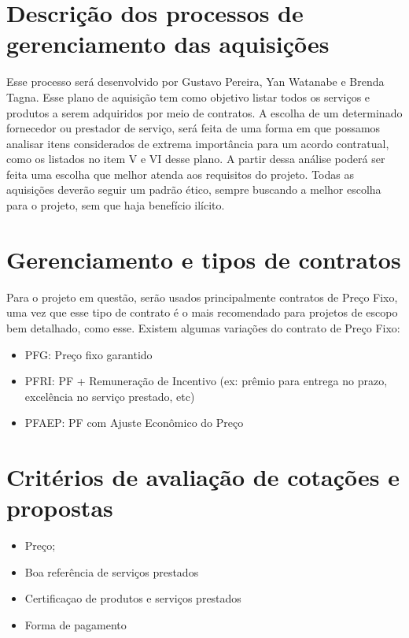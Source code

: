 \section*{Descrição dos processos de gerenciamento das aquisições}
  Esse processo será desenvolvido por Gustavo Pereira, Yan Watanabe e Brenda Tagna. Esse plano de aquisição tem como objetivo listar todos os serviços e produtos a serem adquiridos por meio de contratos. 
A escolha de um determinado fornecedor ou prestador de serviço, será feita de uma forma em que possamos analisar itens considerados de extrema importância para um acordo contratual, como os listados no item V e VI desse plano. A partir dessa análise poderá ser feita uma escolha que melhor atenda aos requisitos do projeto. 
Todas as aquisições deverão seguir um padrão ético, sempre buscando a melhor escolha para o projeto, sem que haja benefício ilícito. 

   
\section*{Gerenciamento e tipos de contratos}
Para o projeto em questão, serão usados principalmente contratos de Preço Fixo, uma vez que esse tipo de contrato é o mais recomendado para projetos de escopo bem detalhado, como esse. 
Existem algumas variações do contrato de Preço Fixo:
\begin{itemize}

\item PFG: Preço fixo garantido
\item PFRI: PF + Remuneração de Incentivo (ex: prêmio para entrega no prazo, excelência no serviço prestado, etc)
\item PFAEP: PF com Ajuste Econômico do Preço
\end{itemize}

\section*{Critérios de avaliação de cotações e propostas}
\begin{itemize}
\item Preço;
\item Boa referência de serviços prestados
\item Certificaçao de produtos e serviços prestados
\item Forma de pagamento
\end{itemize}

